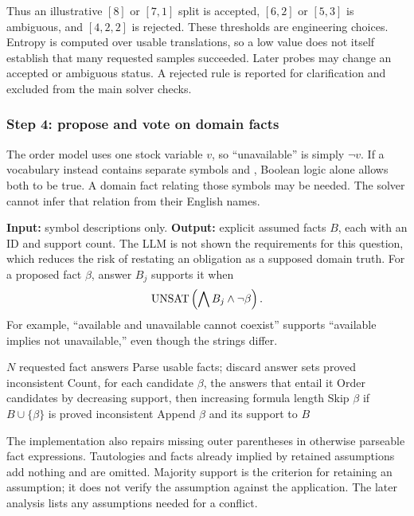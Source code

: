 Thus an illustrative $[8]$ or $[7,1]$ split is accepted, $[6,2]$ or
$[5,3]$ is ambiguous, and $[4,2,2]$ is rejected. These thresholds are
engineering choices. Entropy is computed over usable translations, so a
low value does not itself establish that many requested samples succeeded.
Later probes may change an accepted or ambiguous status. A rejected rule
is reported for clarification and excluded from the main solver checks.

\subsubsection{Step 4: propose and vote on domain facts}
The order model uses one stock variable $v$, so ``unavailable'' is simply
$\neg v$. If a vocabulary instead contains separate symbols
 and , Boolean logic alone
allows both to be true. A domain fact relating those symbols may be
needed. The solver cannot infer that relation from their English names.

\textbf{Input:} symbol descriptions only.
\textbf{Output:} explicit assumed facts $B$, each with an ID and support
count. The LLM is not shown the requirements for this question, which
reduces the risk of restating an obligation as a supposed domain truth.
For a proposed fact $\beta$, answer $B_j$ supports it when
\[
 \operatorname{UNSAT}\left(\bigwedge B_j\land\neg\beta\right).
\]
For example, ``available and unavailable cannot coexist'' supports
``available implies not unavailable,'' even though the strings differ.

\begin{algorithm}[H]
\caption{Keep supported domain assumptions}\label{alg:facts}
\begin{algorithmic}[1]
\Require $N$ requested fact answers
\State Parse usable facts; discard answer sets proved inconsistent
\State Count, for each candidate $\beta$, the answers that entail it
\State Order candidates by decreasing support, then increasing formula length
    \State Skip $\beta$ if $B\cup\{\beta\}$ is proved inconsistent
    \State Append $\beta$ and its support to $B$
  \EndIf
\EndFor
\end{algorithmic}
\end{algorithm}

The implementation also repairs missing outer parentheses in otherwise
parseable fact expressions. Tautologies and facts already implied by
retained assumptions add nothing and are omitted. Majority support is the
criterion for retaining an assumption; it does not verify the assumption
against the application. The later analysis lists any assumptions needed
for a conflict.

